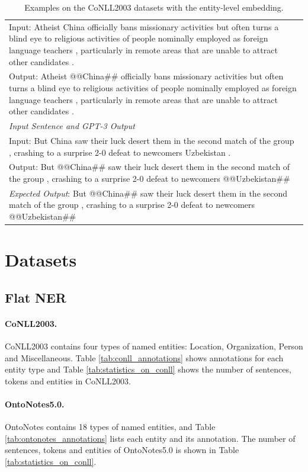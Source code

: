 \documentclass{article}
\begin{document}
\begin{table}[th!]
{\begin{tabular}{l}
Input: Atheist China officially bans missionary activities but often turns a blind eye to religious activities of people nominally employed as foreign language teachers , particularly in remote areas that are unable to attract other candidates . \\
Output: Atheist @@China\#\# officially bans missionary activities but often turns a blind eye to religious activities of people nominally employed as foreign language teachers , particularly in remote areas that are unable to attract other candidates . \\\midrule
\textit{Input Sentence and GPT-3 Output} \\
Input: But China saw their luck desert them in the second match of the group , crashing to a surprise 2-0 defeat to newcomers Uzbekistan . \\
Output: But @@China\#\# saw their luck desert them in the second match of the group , crashing to a surprise 2-0 defeat to newcomers @@Uzbekistan\#\# \\
{\color{blue}\it Expected Output}: But @@China\#\# saw their luck desert them in the second match of the group , crashing to a surprise 2-0 defeat to newcomers @@Uzbekistan\#\#  \\\bottomrule
    \end{tabular}
    }
     \caption{Examples on the CoNLL2003 datasets with the entity-level embedding.}
    \label{tab:example_entity_level_embedding}
\end{table}

\section{Datasets}
\subsection{Flat NER}
\label{flat_ner_datasets_details}

\paragraph{CoNLL2003.} CoNLL2003 \cite{sang2003introduction} contains four types of named entities: Location, Organization, Person and Miscellaneous. Table \ref{tab:conll_annotations} shows annotations for each entity type and Table \ref{tab:statistics_on_conll} shows the number of sentences, tokens and entities in CoNLL2003.

\paragraph{OntoNotes5.0.} OntoNotes \cite{pradhan2013towards} contains 18 types of named entities, and Table \ref{tab:ontonotes_annotations} lists each entity and its annotation. The number of sentences, tokens and entities of OntoNotes5.0 is shown in Table \ref{tab:statistics_on_conll}.
\end{document}

